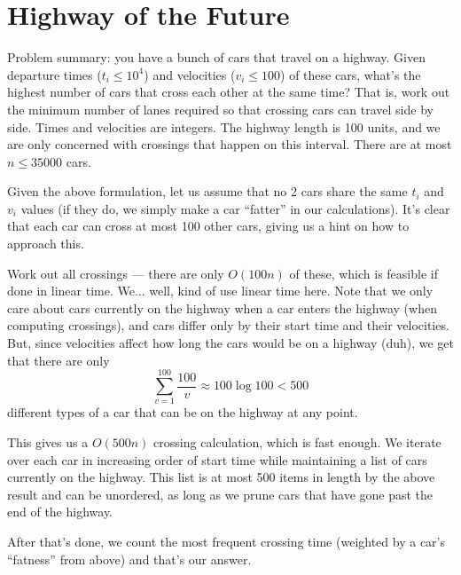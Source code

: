 \section{Highway of the Future}

Problem summary: you have a bunch of cars that travel on a highway. Given
departure times ($t_i \leq 10^4$) and velocities ($v_i \leq 100$) of these cars,
what's the highest number of cars that cross each other at the same time? That
is, work out the minimum number of lanes required so that crossing cars can
travel side by side. Times and velocities are integers. The highway length is
100 units, and we are only concerned with crossings that happen on this
interval. There are at most $n \leq 35000$ cars.

Given the above formulation, let us assume that no 2 cars share the same $t_i$
and $v_i$ values (if they do, we simply make a car ``fatter'' in our
calculations). It's clear that each car can cross at most 100 other cars, giving
us a hint on how to approach this.

Work out all crossings --- there are only $O(100n)$ of these, which is feasible
if done in linear time. We... well, kind of use linear time here. Note that we
only care about cars currently on the highway when a car enters the highway
(when computing crossings), and cars differ only by their start time and their
velocities. But, since velocities affect how long the cars would be on a highway
(duh), we get that there are only $$\sum_{v=1}^{100} \frac{100}{v} \approx 100
\log 100 < 500$$ different types of a car that can be on the highway at any
point.

This gives us a $O(500n)$ crossing calculation, which is fast enough. We iterate
over each car in increasing order of start time while maintaining a list of cars
currently on the highway. This list is at most 500 items in length by the above
result and can be unordered, as long as we prune cars that have gone past the
end of the highway.

After that's done, we count the most frequent crossing time (weighted by a car's
``fatness'' from above) and that's our answer.
